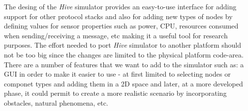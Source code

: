 The desing of the \textit{Hive} simulator provides an easy-to-use interface
for adding support for other protocol stacks and also for adding new types of
nodes by defining values for sensor properties such as power, CPU, resources
consumed when sending/receiving a message, etc making it a useful tool for
research purposes.
The effort needed to port \textit{Hive} simulator to another platform should
not be too big since the changes are limited to the physical platform
code-area.
There are a number of features that we want to add to the simulator such as: a
GUI in order to make it easier to use - at first limited to selecting nodes
or componet types and adding them in a 2D space and later, at a more developed phase, it could
permit to create a more realistic scenario by incorporating obstacles, natural
phenomena, etc.  
